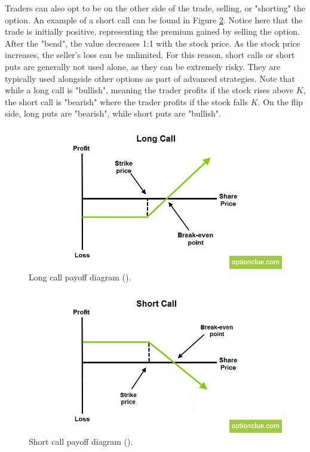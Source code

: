 \documentclass{article}
\begin{document}
\indent Traders can also opt to be on the other side of the trade, selling, or "shorting" the option. An example of a short call can be found in Figure \ref{fig:Figure 2}. Notice here that the trade is initially positive, representing the premium gained by selling the option. After the "bend", the value decreases 1:1 with the stock price. As the stock price increases, the seller's loss can be unlimited. For this reason, short calls or short puts are generally not used alone, as they can be extremely risky. They are typically used alongside other options as part of advanced strategies. Note that while a long call is "bullish", meaning the trader profits if the stock rises above $K$, the short call is "bearish" where the trader profits if the stock falls $K$. On the flip side, long puts are "bearish", while short puts are "bullish". 

\begin{figure}[htbp]
    \centering
    \includegraphics[width=1\textwidth]{assets/Long-Call.jpg}
    \caption{\label{fig:Figure 1}Long call payoff diagram (\cite{optionclue1}).}
\end{figure}

\begin{figure}[htbp]
    \centering
    \includegraphics[width=1\textwidth]{assets/Short-Call.jpg}
    \caption{\label{fig:Figure 2}Short call payoff diagram (\cite{optionclue2}).}
\end{figure}
\end{document}
